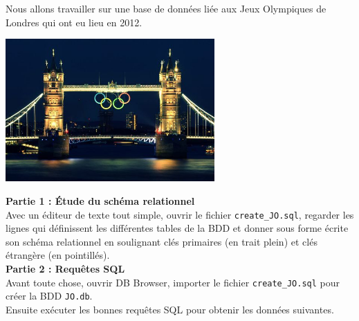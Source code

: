\documentclass[10pt,cours,a4paper,firamath]{nsi}
\begin{document}
\begin{exercice}[ : JO]
    Nous allons travailler sur une base de données liée aux Jeux Olympiques de Londres qui ont eu lieu en 2012.\\
    \begin{center}
        \includegraphics[width=8cm]{img/jo_london}
    \end{center}
    
    \textbf{\large Partie 1 : \'Etude du schéma relationnel}\\
    
    Avec un éditeur de texte tout simple, ouvrir le fichier \texttt{create\_JO.sql}, regarder les lignes qui définissent les différentes tables de la BDD et donner sous forme écrite son schéma relationnel en soulignant clés primaires (en trait plein) et clés étrangère (en pointillés).\\
    
    \textbf{\large Partie 2 : Requêtes SQL}\\
    
    Avant toute chose, ouvrir DB Browser, importer le fichier \texttt{create\_JO.sql} pour créer la BDD \texttt{JO.db}.\\
    Ensuite exécuter les bonnes requêtes SQL pour obtenir les données suivantes.\\
    

\end{exercice}
\end{document}
